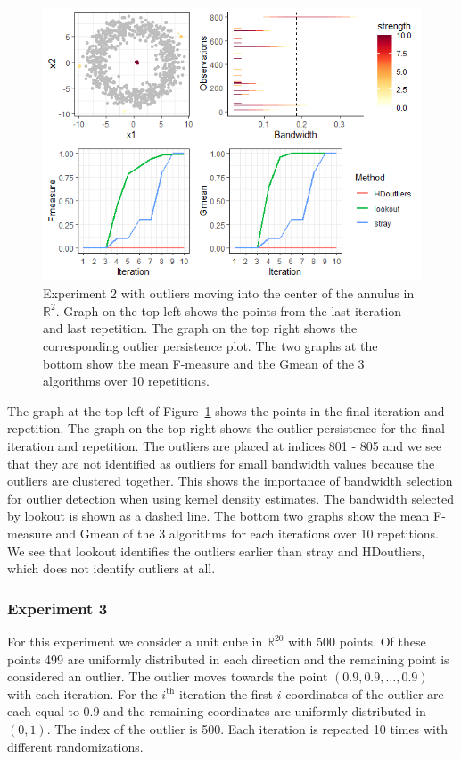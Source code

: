 \documentclass[letter,12pt]{article}
\begin{document}
\begin{figure}[!ht]
    \centering
    \includegraphics[scale=0.8]{Graphics/Comparison_Ex2.png}
    \caption{Experiment 2 with outliers moving into the center of the annulus in $\mathbb{R}^2$. Graph on the top left shows the points from the last iteration and last repetition. The graph on the top right shows the corresponding outlier persistence plot. The  two graphs at the bottom show the mean F-measure and the Gmean of the 3 algorithms over 10 repetitions. }
    \label{fig:ComparisonEx2}
\end{figure}

The graph at the top left of  Figure~\ref{fig:ComparisonEx2} shows the points in the final iteration and repetition. The graph on the top right shows the outlier persistence for the final iteration and repetition. The outliers are placed at indices 801 - 805 and we see that they are not identified as outliers for small bandwidth values because the outliers are clustered together. This shows the importance of bandwidth selection for outlier detection when using kernel density estimates. The bandwidth selected by lookout is shown as a dashed line.  The bottom two graphs show the mean F-measure and Gmean of the 3 algorithms for each iterations over 10 repetitions. We see that lookout identifies the outliers earlier than stray and HDoutliers, which does not identify outliers at all. 
\subsubsection{Experiment 3}\label{sec:exp3}
For this experiment we consider a unit cube in $\mathbb{R}^{20}$ with 500 points. Of these points 499 are uniformly distributed in each direction and the remaining point is considered an outlier. The outlier moves towards the point $\left( 0.9, 0.9, \ldots, 0.9 \right)$ with each iteration. For the $i^{\text{th}}$ iteration the first $i$ coordinates of the outlier are each equal to $0.9$ and the remaining coordinates are uniformly distributed in $(0,1)$. The index of the outlier is 500. Each iteration is repeated 10 times with different randomizations. 
\end{document}
